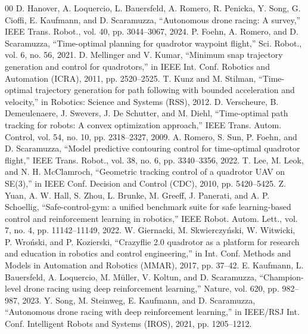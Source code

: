 \documentclass[conference]{IEEEtran}
\begin{document}
\begin{thebibliography}{00}
 D. Hanover, A. Loquercio, L. Bauersfeld, A. Romero, R. Penicka, Y. Song, G. Cioffi, E. Kaufmann, and D. Scaramuzza, ``Autonomous drone racing: A survey,'' IEEE Trans. Robot., vol. 40, pp. 3044--3067, 2024.
 P. Foehn, A. Romero, and D. Scaramuzza, ``Time-optimal planning for quadrotor waypoint flight,'' Sci. Robot., vol. 6, no. 56, 2021.
 D. Mellinger and V. Kumar, ``Minimum snap trajectory generation and control for quadrotors,'' in IEEE Int. Conf. Robotics and Automation (ICRA), 2011, pp. 2520--2525.
 T. Kunz and M. Stilman, ``Time-optimal trajectory generation for path following with bounded acceleration and velocity,'' in Robotics: Science and Systems (RSS), 2012.
 D. Verscheure, B. Demeulenaere, J. Swevers, J. De Schutter, and M. Diehl, ``Time-optimal path tracking for robots: A convex optimization approach,'' IEEE Trans. Autom. Control, vol. 54, no. 10, pp. 2318--2327, 2009.
 A. Romero, S. Sun, P. Foehn, and D. Scaramuzza, ``Model predictive contouring control for time-optimal quadrotor flight,'' IEEE Trans. Robot., vol. 38, no. 6, pp. 3340--3356, 2022.
 T. Lee, M. Leok, and N. H. McClamroch, ``Geometric tracking control of a quadrotor UAV on SE(3),'' in IEEE Conf. Decision and Control (CDC), 2010, pp. 5420--5425.
 Z. Yuan, A. W. Hall, S. Zhou, L. Brunke, M. Greeff, J. Panerati, and A. P. Schoellig, ``Safe-control-gym: a unified benchmark suite for safe learning-based control and reinforcement learning in robotics,'' IEEE Robot. Autom. Lett., vol. 7, no. 4, pp. 11142--11149, 2022.
 W. Giernacki, M. Skwierczy\'nski, W. Witwicki, P. Wro\'nski, and P. Kozierski, ``Crazyflie 2.0 quadrotor as a platform for research and education in robotics and control engineering,'' in Int. Conf. Methods and Models in Automation and Robotics (MMAR), 2017, pp. 37--42.
 E. Kaufmann, L. Bauersfeld, A. Loquercio, M. M\"uller, V. Koltun, and D. Scaramuzza, ``Champion-level drone racing using deep reinforcement learning,'' Nature, vol. 620, pp. 982--987, 2023.
 Y. Song, M. Steinweg, E. Kaufmann, and D. Scaramuzza, ``Autonomous drone racing with deep reinforcement learning,'' in IEEE/RSJ Int. Conf. Intelligent Robots and Systems (IROS), 2021, pp. 1205--1212.
\end{thebibliography}
\end{document}
